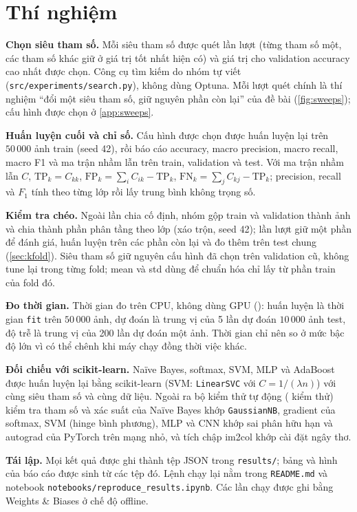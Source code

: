 \section{Thí nghiệm}
\label{sec:protocol}
\textbf{Chọn siêu tham số.} Mỗi siêu tham số được quét lần lượt (từng tham số một, các tham số khác giữ ở giá trị tốt nhất hiện có) và giá trị cho validation accuracy cao nhất được chọn. Công cụ tìm kiếm do nhóm tự viết (\texttt{src/experiments/search.py}), không dùng Optuna. Mỗi lượt quét chính là thí nghiệm ``đổi một siêu tham số, giữ nguyên phần còn lại'' của đề bài (\cref{fig:sweeps}); cấu hình được chọn ở \cref{app:sweeps}.

\textbf{Huấn luyện cuối và chỉ số.} Cấu hình được chọn được huấn luyện lại trên $50\,000$ ảnh train (seed 42), rồi báo cáo accuracy, macro precision, macro recall, macro F1 và ma trận nhầm lẫn trên train, validation và test. Với ma trận nhầm lẫn $C$, $\mathrm{TP}_k=C_{kk}$, $\mathrm{FP}_k=\sum_i C_{ik}-\mathrm{TP}_k$, $\mathrm{FN}_k=\sum_j C_{kj}-\mathrm{TP}_k$; precision, recall và $F_1$ tính theo từng lớp rồi lấy trung bình không trọng số.

\textbf{Kiểm tra chéo.} Ngoài lần chia cố định, nhóm gộp train và validation thành \kfoldPool{} ảnh và chia thành \kfoldK phần phân tầng theo lớp (xáo trộn, seed 42); lần lượt giữ một phần để đánh giá, huấn luyện trên các phần còn lại và đo thêm trên test chung (\cref{sec:kfold}). Siêu tham số giữ nguyên cấu hình đã chọn trên validation cũ, không tune lại trong từng fold; mean và std dùng để chuẩn hóa chỉ lấy từ phần train của fold đó.

\textbf{Đo thời gian.} Thời gian đo trên CPU, không dùng GPU (): huấn luyện là thời gian \texttt{fit} trên $50\,000$ ảnh, dự đoán là trung vị của 5 lần dự đoán $10\,000$ ảnh test, độ trễ là trung vị của 200 lần dự đoán một ảnh. Thời gian chỉ nên so ở mức bậc độ lớn vì có thể chênh khi máy chạy đồng thời việc khác.

\textbf{Đối chiếu với scikit-learn.} Naïve Bayes, softmax, SVM, MLP và AdaBoost được huấn luyện lại bằng scikit-learn (SVM: \texttt{LinearSVC} với $C=1/(\lambda n)$) với cùng siêu tham số và cùng dữ liệu. Ngoài ra bộ kiểm thử tự động ( kiểm thử) kiểm tra tham số và xác suất của Naïve Bayes khớp \texttt{GaussianNB}, gradient của softmax, SVM (hinge bình phương), MLP và CNN khớp sai phân hữu hạn và autograd của PyTorch trên mạng nhỏ, và tích chập im2col khớp cài đặt ngây thơ.

\textbf{Tái lập.} Mọi kết quả được ghi thành tệp JSON trong \texttt{results/}; bảng và hình của báo cáo được sinh từ các tệp đó. Lệnh chạy lại nằm trong \texttt{README.md} và notebook \texttt{notebooks/reproduce\_results.ipynb}. Các lần chạy được ghi bằng Weights \& Biases \citep{wandb} ở chế độ offline.
